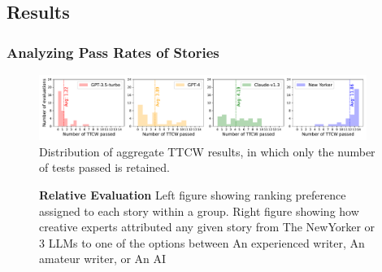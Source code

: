 \subsection{Results} \label{ref:humanresult}
\subsubsection{Analyzing Pass Rates of Stories}
\begin{figure}
    \centering
    \includegraphics[width=0.95\textwidth]{figures/Creativity_Aggregate_Performance.pdf}
    \caption{Distribution of aggregate TTCW results, in which only the number of tests passed is retained. }
    \label{fig:ttcw_aggregate_histogram}
\end{figure}

\begin{figure}[!ht]
     \quad
    \caption{\label{relativehumaneval1} \textbf{Relative Evaluation} Left figure showing ranking preference assigned to each story within a group. Right figure showing how creative experts attributed any given story from The NewYorker or 3 LLMs to one of the options between An experienced writer, An amateur writer, or An AI }
\end{figure}

